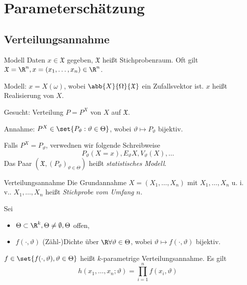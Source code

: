 \section{Parameterschätzung}
\subsection{}
\subsection{Verteilungsannahme}
\begin{karte}{Modell}
Daten \(x\in \mathfrak{X}\) gegeben, \(\mathfrak{X}\) heißt Stichprobenraum. 
Oft gilt \(\mathfrak{X} = \R^n, x = (x_1, \ldots, x_n) \in \R^n\).

Modell: 
\(x = X(\omega)\), wobei \(\abb{X}{\Omega}{\mathfrak{X}}\) ein Zufallsvektor ist. 
\(x\) heißt Realisierung von \(X\).

Gesucht: 
Verteilung \(P = P^X\) von \(X\) auf \(\mathfrak{X}\).

Annahme: \(P^X \in \set{P_\vartheta : \vartheta \in \Theta}\), wobei \(\vartheta \mapsto P_\vartheta\) bijektiv.

Falls \(P^X = P_\vartheta\), verwednen wir folgende Schreibweise 
\[ P_\vartheta(X=x), E_\vartheta X, V_\vartheta(X), \ldots \]
Das Paar \( (\mathfrak{X}, (P_\vartheta)_{\vartheta \in \Theta}) \) heißt \textit{statistisches Modell}.
\end{karte}

\begin{karte}{Verteilungsannahme}
    Die Grundannahme \(X = (X_1, \ldots, X_n)\) mit \(X_1, \ldots, X_n\) u. i. v..
    \(X_1, \ldots, X_n\) heißt \textit{Stichprobe vom Umfang \(n\)}.

    Sei 
    \begin{itemize}
        \item \(\Theta \subset \R^k, \Theta \neq \emptyset, \Theta\) offen, 
        \item \(f(\cdot, \vartheta)\) (Zähl-)Dichte über \(\R \forall \vartheta \in \Theta\), 
        wobei \(\vartheta \mapsto f(\cdot, \vartheta)\) bijektiv. 
    \end{itemize}
    \(f \in \set{f(\cdot, \vartheta), \vartheta \in \Theta}\) heißt \(k\)-parametrige Verteilungsannahme.
    Es gilt 
    \[ h(x_1, \ldots, x_n; \vartheta) = \prod_{i=1}^n f(x_i, \vartheta) \]
\end{karte}

